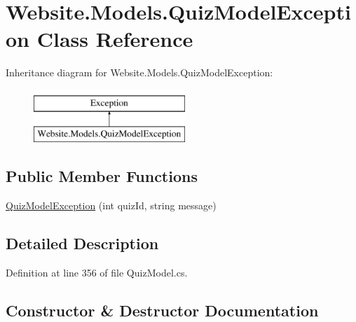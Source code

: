 \hypertarget{class_website_1_1_models_1_1_quiz_model_exception}{}\section{Website.\+Models.\+Quiz\+Model\+Exception Class Reference}
\label{class_website_1_1_models_1_1_quiz_model_exception}
Inheritance diagram for Website.\+Models.\+Quiz\+Model\+Exception\+:\begin{figure}[H]
\begin{center}
\leavevmode
\includegraphics[height=2.000000cm]{class_website_1_1_models_1_1_quiz_model_exception}
\end{center}
\end{figure}
\subsection*{Public Member Functions}
\begin{DoxyCompactItemize}
\item 
\hyperlink{class_website_1_1_models_1_1_quiz_model_exception_acb4ddefd5c7d262a11592ceef1ef30a7}{Quiz\+Model\+Exception} (int quiz\+Id, string message)
\end{DoxyCompactItemize}


\subsection{Detailed Description}


Definition at line 356 of file Quiz\+Model.\+cs.



\subsection{Constructor \& Destructor Documentation}
\hypertarget{class_website_1_1_models_1_1_quiz_model_exception_acb4ddefd5c7d262a11592ceef1ef30a7}{}
